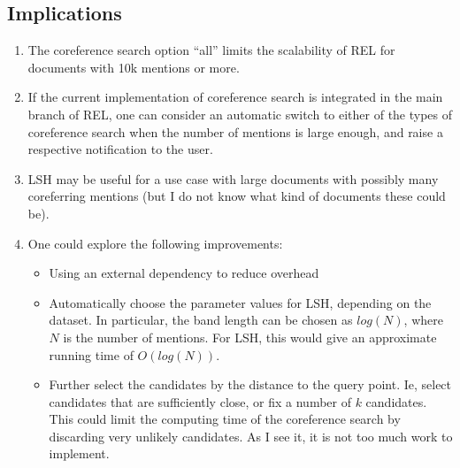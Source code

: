 \documentclass[a4paper,11pt]{article}
\numberwithin{equation}{section} %
\begin{document}
\subsection{Implications}

\begin{enumerate}
 \item The coreference search option ``all'' limits the scalability of REL for documents with 10k mentions or more.
 \item If the current implementation of coreference search is integrated in the main branch of REL, one can consider an automatic switch to either of the types of coreference search when the number of mentions is large enough, and raise a respective notification to the user. 
 \item LSH may be useful for a use case with large documents with possibly many coreferring mentions (but I do not know what kind of documents these could be). 
 \item One could explore the following improvements:
    \begin{itemize}
     \item Using an external dependency to reduce overhead 
     \item Automatically choose the parameter values for LSH, depending on the dataset. In particular, the band length can be chosen as $log(N)$, where $N$ is the number of mentions. For LSH, this would give an approximate running time of $O(log(N))$.
     \item Further select the candidates by the distance to the query point. Ie, select candidates that are sufficiently close, or fix a number of $k$ candidates. This could limit the computing time of the coreference search by discarding very unlikely candidates. As I see it, it is not too much work to implement. 
    \end{itemize}
\end{enumerate}




\end{document}
